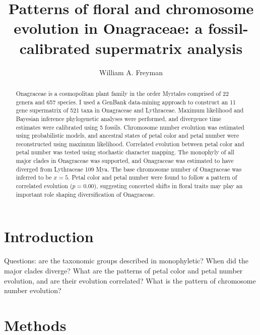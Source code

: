 \documentclass[review]{elsarticle}
\begin{document}
\begin{frontmatter}

\title{Patterns of floral and chromosome evolution in Onagraceae: a fossil-calibrated supermatrix analysis}

\author[berk]{William A. Freyman}

\address[berk]{Jepson Herbarium and Department of Integrative Biology, University of California, Berkeley}

\begin{abstract}
Onagraceae is a cosmopolitan plant family in the order Myrtales comprised of 22 genera and 657 species.
I used a GenBank data-mining approach to construct an 11 gene supermatrix of 521 taxa in Onagraceae and Lythraceae.
Maximum likelihood and Bayesian inference phylogenetic analyses were performed, 
and divergence time estimates were calibrated using 5 fossils.
Chromosome number evolution was estimated using probabilistic models,
and ancestral states of petal color and petal number were reconstructed using maximum likelihood.
Correlated evolution between petal color and petal number was tested using
stochastic character mapping.
The monophyly of all major clades in Onagraceae was supported,
and Onagraceae was estimated to have diverged from Lythraceae 109 Mya. 
The base chromosome number of Onagraceae was inferred to be $x=5$.
Petal color and petal number were found
to follow a pattern of correlated evolution ($p=0.00$), 
suggesting concerted shifts in floral traits may play an important role shaping diversification of Onagraceae. 
\end{abstract}

\end{frontmatter}




\section{Introduction}

Questions: are the taxonomic groups described in \citet{wagner2007revised} monophyletic?
When did the major clades diverge?
What are the patterns of petal color and petal number evolution, and
are their evolution correlated?
What is the pattern of chromosome number evolution?


\section{Methods}
\end{document}
